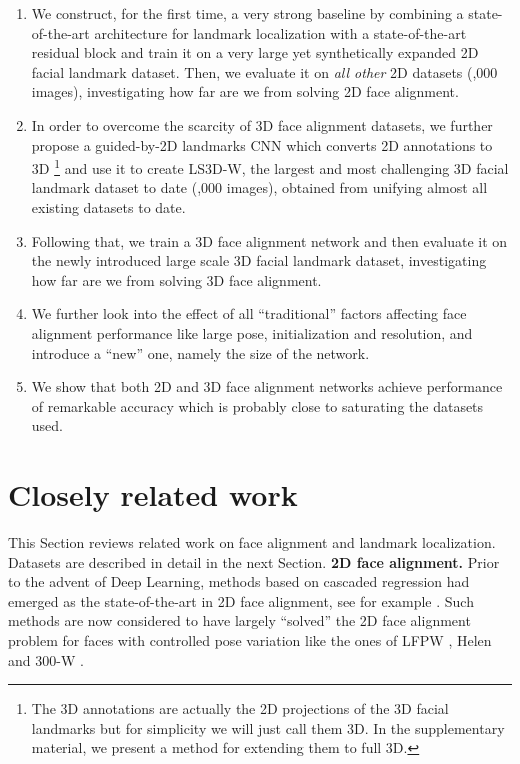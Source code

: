 \begin{enumerate}[leftmargin=*]

		\item We construct, for the first time, a very strong baseline by combining a state-of-the-art architecture for landmark localization with a state-of-the-art residual block and train it on a very large yet synthetically expanded 2D facial landmark dataset. Then, we evaluate it on \textit{all other} 2D datasets (,000 images), investigating how far are we from solving 2D face alignment.
		\item
		In order to overcome the scarcity of 3D face alignment datasets, we further propose a guided-by-2D landmarks CNN which converts 2D annotations to 3D \footnote{The 3D annotations are actually the 2D projections of the 3D facial landmarks but for simplicity we will just call them 3D. In the supplementary material, we present a method for extending them to full 3D.} and use it to create LS3D-W, the largest and most challenging 3D facial landmark dataset to date (,000 images), obtained from unifying almost all existing datasets to date.
		\item
		Following that, we train a 3D face alignment network and then evaluate it on the newly introduced large scale 3D facial landmark dataset, investigating how far are we from solving 3D face alignment.  
		\item
		We further look into the effect of all ``traditional''  factors affecting face alignment performance like large pose, initialization and resolution, and  introduce a ``new'' one, namely the size of the network. 
		\item
		We show that both 2D and 3D face alignment networks achieve performance of remarkable accuracy which is probably close to saturating the datasets used.      
	\end{enumerate}

	\section{Closely related work} This Section reviews related work on face alignment and landmark localization. Datasets are described in detail in the next Section. 
	\textbf{2D face alignment.} Prior to the advent of Deep Learning, methods based on cascaded regression had emerged as the state-of-the-art in 2D face alignment, see for example \cite{Cao2012shaperegression,xiong2013supervised,zhu2016face,tzimiropoulos2015project}. Such methods are now considered to have largely ``solved'' the 2D face alignment problem for faces with controlled pose variation like the ones of LFPW \cite{belhumeur2011localizing}, Helen \cite{le2012interactive} and 300-W \cite{sagonas2013semi}. 

